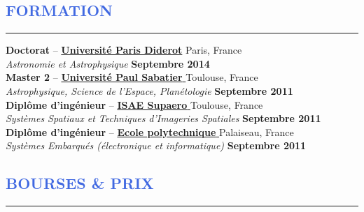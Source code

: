 \documentclass[11pt,a4paper, french]{article}
\begin{document}

\vspace{-0.3cm}
\textcolor{RoyalBlue}{\section{\large FORMATION}
\vspace{-0.2cm}\hrule}
\vspace{0.4cm}

{\bf Doctorat} -- \href{https://www.univ-paris-diderot.fr/}{\textbf{Universit\'e Paris Diderot}}
\hfill Paris, France\\
{\small \it Astronomie et Astrophysique} \hfill  {\small \bf Septembre 2014}\\

\vspace{-0.05cm}
{\bf Master 2} --
\href{http://ezomp2.omp.obs-mip.fr/asep/index.php/fre}{\textbf{Université Paul Sabatier} }
 \hfill Toulouse, France\\
{\small \it Astrophysique, Science de l'Espace, Planétologie} \hfill { \small \bf Septembre 2011}\\

\vspace{-0.05cm}
{\bf Diplôme d'ingénieur} -- \href{https://www.isae-supaero.fr/}{\textbf{\textbf{ISAE Supaero} }}  \hfill Toulouse, France\\
{\small \it Systèmes Spatiaux et Techniques d'Imageries Spatiales} \hfill { \small \bf Septembre 2011}\\


\vspace{-0.05cm}
{\bf Diplôme d'ingénieur} --
\href{http://www.polytechnique.edu/}{\textbf{\textbf{Ecole polytechnique} }}
\hfill Palaiseau, France  \\
{\small \it Systèmes Embarqués (électronique et informatique)}   \hfill {\small \bf Septembre 2011}\\


\vspace{-0.3cm}
\textcolor{RoyalBlue}{\section{\large BOURSES \& PRIX}
\vspace{-0.2cm}\hrule}
\vspace{0.4cm}
\end{document}
